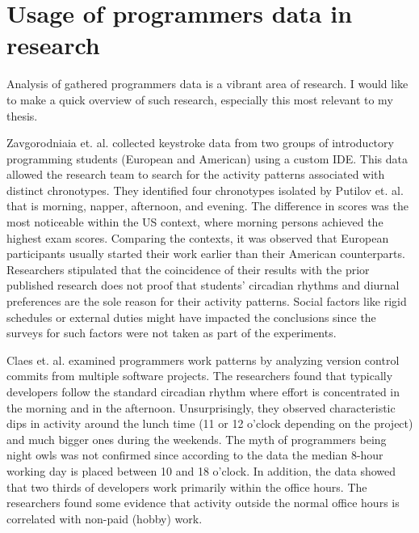 \section{Usage of programmers data in research}


Analysis of gathered programmers data is a vibrant area of research. I would like to make a quick overview of such research, especially this most relevant to my thesis.

Zavgorodniaia et. al. \cite{Zav21MorningEvening} collected keystroke data from two groups of introductory programming students (European and American) using a custom IDE. This data allowed the research team to search for the activity patterns associated with distinct chronotypes. They identified four chronotypes isolated by Putilov et. al. \cite{Put19FourChronotypes} that is morning, napper, afternoon, and evening. The difference in scores was the most noticeable within the US context, where morning persons achieved the highest exam scores. Comparing the contexts, it was observed that European participants usually started their work earlier than their American counterparts. Researchers stipulated that the coincidence of their results with the prior published research does not proof that students’ circadian rhythms and diurnal preferences are the sole reason for their activity patterns. Social factors like rigid schedules or external duties might have impacted the conclusions since the surveys for such factors were not taken as part of the experiments.

Claes et. al. \cite{Cla18NightWeekend} examined programmers work patterns by analyzing version control commits from multiple software projects. The researchers found that typically developers follow the standard circadian rhythm where effort is concentrated in the morning and in the afternoon. Unsurprisingly, they observed characteristic dips in activity around the lunch time (11 or 12 o'clock depending on the project) and much bigger ones during the weekends. The myth of programmers being night owls was not confirmed since according to the data the median 8-hour working day is placed between 10 and 18 o'clock. In addition, the data showed that two thirds of developers work primarily within the office hours. The researchers found some evidence that activity outside the normal office hours is correlated with non-paid (hobby) work.

